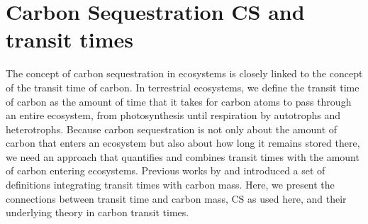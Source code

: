 \documentclass[ProofPDF]{./Styles/Jnls-Template-V3}
\newcommand{\CS}{\mathrm{CS}}
\begin{document}
\section{Carbon Sequestration CS and transit times} 
\label{sec:appCS}
The concept of carbon sequestration in ecosystems is closely linked to the concept of the transit time of carbon. In terrestrial ecosystems, we define the transit time of carbon as the amount of time that it takes for carbon atoms to pass through an entire ecosystem, from photosynthesis until respiration by autotrophs and heterotrophs. 
Because carbon sequestration is not only about the amount of carbon that enters an ecosystem but also about how long it remains stored there, we need an approach that quantifies and combines transit times with the amount of carbon entering ecosystems. Previous works by \citet{Sierra2021} and \citet{Metzler2024} introduced a set of definitions integrating transit times with carbon mass. 
Here, we present the connections between transit time and carbon mass, $\CS$ as used here, and their underlying theory in carbon transit times.
\end{document}
